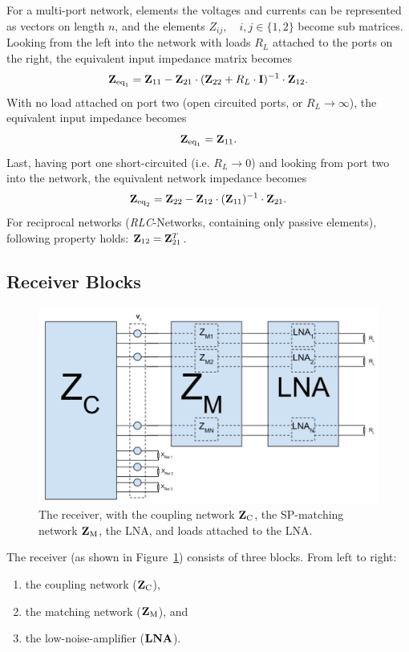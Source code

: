 For a multi-port network, elements the voltages and currents can be represented as vectors on length $n$, and the elements $Z_{ij},\quad i,j\in\{1,2\}$ become sub matrices.
Looking from the left into the network with loads $R_L$ attached to the ports on the right, the equivalent input impedance matrix becomes
\begin{equation}
\label{eq:eq_imp_load}
\mathbf{Z}_{\text{eq}_1} = \mathbf{Z}_{11} - \mathbf{Z}_{21}\cdot(\mathbf{Z}_{22} + R_L\cdot\mathbf{I})^{-1}\cdot \mathbf{Z}_{12}.
\end{equation}
With no load attached on port two (open circuited ports, or $R_L\rightarrow\infty$), the equivalent input impedance becomes
\begin{equation}
\label{eq:eq_imp_oc}
\mathbf{Z}_{\text{eq}_1} = \mathbf{Z}_{11}.
\end{equation}
Last, having port one short-circuited (i.e.  $R_L\rightarrow 0$) and looking from port two into the network, the equivalent network impedance becomes
\begin{equation}
\label{eq:eq_imp_sc}
\mathbf{Z}_{\text{eq}_2} = \mathbf{Z}_{22} - \mathbf{Z}_{12}\cdot(\mathbf{Z}_{11})^{-1}\cdot \mathbf{Z}_{21}.
\end{equation}
For reciprocal networks (\textit{RLC}-Networks, containing only passive elements), following property holds: $\mathbf{Z}_{12} = \mathbf{Z}_{21}^T$.

\subsection{Receiver Blocks}
\begin{figure}[h]
\centering
  \includegraphics[width=0.9\linewidth]{images/Full_Receiver.png}
\caption{The receiver, with the coupling network $\mathbf{Z}_\text{C}$, the SP-matching network $\mathbf{Z}_\text{M}$, the LNA, and loads attached to the LNA.}
\label{fig:receiver}
\end{figure}
The receiver (as shown in Figure~\ref{fig:receiver}) consists of three blocks.
From left to right:
\begin{enumerate}
\item{the coupling network ($\mathbf{Z}_\text{C}$),}
\item{the matching network ($\mathbf{Z}_\text{M}$), and}
\item{the low-noise-amplifier ($\mathbf{LNA}$).}
\end{enumerate}
 

